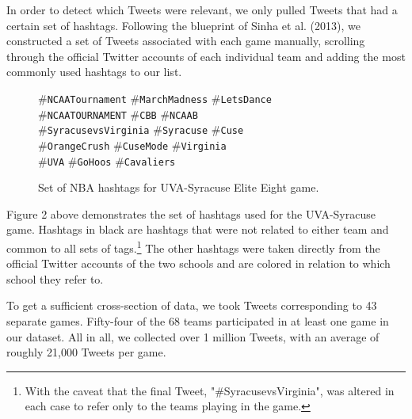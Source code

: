 \documentclass[12pt]{article}
\begin{document}
\begin{doublespacing}
In order to detect which Tweets were relevant, we only pulled Tweets that had a certain set of hashtags. Following the blueprint of Sinha et al. (2013), we constructed a set of Tweets associated with each game manually, scrolling through the official Twitter accounts of each individual team and adding the most commonly used hashtags to our list. 
\vspace{1cm}
\begin{figure} [H]
    \begin{center}
    \#\texttt{NCAATournament} \#\texttt{MarchMadness} \#\texttt{LetsDance} \\ 
    \#\texttt{NCAATOURNAMENT} \#\texttt{CBB} \#\texttt{NCAAB} \\ 
    \#\texttt{SyracusevsVirginia} \textcolor{cuse}{\#\texttt{Syracuse}} \textcolor{cuse}{\#\texttt{Cuse}} \\ 
    \textcolor{cuse}{\#\texttt{OrangeCrush}} \textcolor{cuse}{\#\texttt{CuseMode}} \textcolor{uva}{\#\texttt{Virginia}} \\ 
    \textcolor{uva}{\#\texttt{UVA}} \textcolor{uva}{\#\texttt{GoHoos}} \textcolor{uva}{\#\texttt{Cavaliers}} \\
    \caption{Set of NBA hashtags for UVA-Syracuse Elite Eight game.}
    \end{center}
\end{figure}

Figure 2 above demonstrates the set of hashtags used for the UVA-Syracuse game. Hashtags in black are hashtags that were not related to either team and common to all sets of tags.\footnote{With the caveat that the final Tweet, "\#SyracusevsVirginia", was altered in each case to refer only to the teams playing in the game.} The other hashtags were taken directly from the official Twitter accounts of the two schools and are colored in relation to which school they refer to. 

To get a sufficient cross-section of data, we took Tweets corresponding to 43 separate games. Fifty-four of the 68 teams participated in at least one game in our dataset. All in all, we collected over 1 million Tweets, with an average of roughly 21,000 Tweets per game. 


\end{doublespacing}
\end{document}
